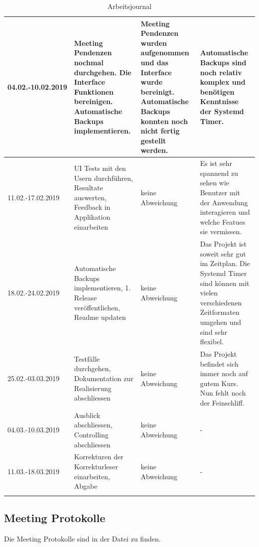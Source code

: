 \begin{landscape}
\begin{longtable}{|p{2cm}|p{5cm}|p{5cm}|p{7cm}|}
\hline
04.02.-10.02.2019 & Meeting Pendenzen nochmal durchgehen. Die Interface Funktionen bereinigen. Automatische Backups implementieren. & Meeting Pendenzen wurden aufgenommen und das Interface wurde bereinigt. Automatische Backups konnten noch nicht fertig gestellt werden. & Automatische Backups sind noch relativ komplex und benötigen Kenntnisse der Systemd Timer.\\
\hline
11.02.-17.02.2019 & UI Tests mit den Usern durchführen, Resultate auswerten, Feedback in Applikation einarbeiten & keine Abweichung & Es ist sehr spannend zu sehen wie Benutzer mit der Anwendung interagieren und welche Featues sie vermissen.\\
\hline
18.02.-24.02.2019 & Automatische Backups implementieren, 1. Release veröffentlichen, Readme updaten & keine Abweichung & Das Projekt ist soweit sehr gut im Zeitplan. Die Systemd Timer sind können mit vielen verschiedenen Zeitformaten umgehen und sind sehr flexibel.\\
\hline
25.02.-03.03.2019 & Testfälle durchgehen, Dokumentation zur Realisierung abschliessen & keine Abweichung & Das Projekt befindet sich immer noch auf gutem Kurs. Nun fehlt noch der Feinschliff.\\
\hline
04.03.-10.03.2019 & Ausblick abschliessen, Controlling abschliessen & keine Abweichung & -\\
\hline
11.03.-18.03.2019 & Korrekturen der Korrekturleser einarbeiten, Abgabe & keine Abweichung & -\\
\hline
\caption{\label{tab:orgc3ff16c}
Arbeitsjournal}
\\
\end{longtable}
\end{landscape}

\subsection{Meeting Protokolle}
\label{sec:orgc2c5a7d}

Die Meeting Protokolle sind in der Datei  zu finden.


